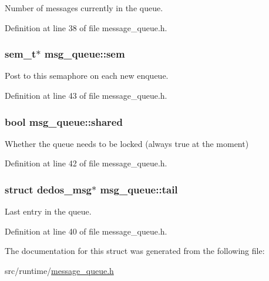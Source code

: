 Number of messages currently in the queue. 



Definition at line 38 of file message\-\_\-queue.\-h.

\hypertarget{structmsg__queue_a0f479c0b10867953149ee7906b4e9cd5}{
\subsubsection[{sem}]{\setlength{\rightskip}{0pt plus 5cm}sem\-\_\-t$\ast$ msg\-\_\-queue\-::sem}}\label{structmsg__queue_a0f479c0b10867953149ee7906b4e9cd5}


Post to this semaphore on each new enqueue. 



Definition at line 43 of file message\-\_\-queue.\-h.

\hypertarget{structmsg__queue_a3cc4b1124f85c79730b77b54ca562d14}{
\subsubsection[{shared}]{\setlength{\rightskip}{0pt plus 5cm}bool msg\-\_\-queue\-::shared}}\label{structmsg__queue_a3cc4b1124f85c79730b77b54ca562d14}


Whether the queue needs to be locked (always true at the moment) 



Definition at line 42 of file message\-\_\-queue.\-h.

\hypertarget{structmsg__queue_a2f86574faae863bc2bf58d3aaa235e23}{
\subsubsection[{tail}]{\setlength{\rightskip}{0pt plus 5cm}struct {\bf dedos\-\_\-msg}$\ast$ msg\-\_\-queue\-::tail}}\label{structmsg__queue_a2f86574faae863bc2bf58d3aaa235e23}


Last entry in the queue. 



Definition at line 40 of file message\-\_\-queue.\-h.



The documentation for this struct was generated from the following file\-:\begin{DoxyCompactItemize}
\item 
src/runtime/\hyperlink{message__queue_8h}{message\-\_\-queue.\-h}\end{DoxyCompactItemize}
